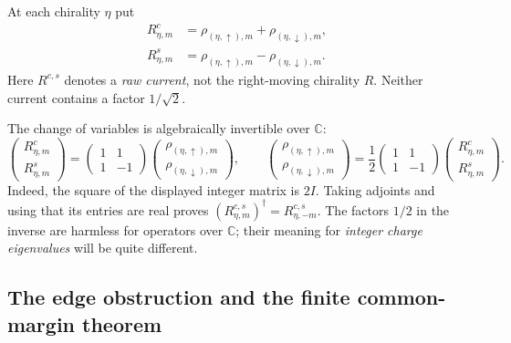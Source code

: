 \begin{definition}
\label{def:ch21-raw-currents}
At each chirality $\eta$ put
\begin{align}
 R^c_{\eta,m}&=\rho_{(\eta,\uparrow),m}
                 +\rho_{(\eta,\downarrow),m},
     \label{eq:ch21-raw-charge}\\
 R^s_{\eta,m}&=\rho_{(\eta,\uparrow),m}
                 -\rho_{(\eta,\downarrow),m}.
     \label{eq:ch21-raw-spin}
\end{align}
Here $R^{c,s}$ denotes a \emph{raw current}, not the right-moving
chirality $R$.  Neither current contains a factor $1/\sqrt2$.
\end{definition}

The change of variables is algebraically invertible over $\mathbb C$:
\begin{equation}
 \begin{pmatrix}R^c_{\eta,m}\\R^s_{\eta,m}\end{pmatrix}
 =\begin{pmatrix}1&1\\1&-1\end{pmatrix}
   \begin{pmatrix}\rho_{(\eta,\uparrow),m}\\
                   \rho_{(\eta,\downarrow),m}\end{pmatrix},
 \qquad
 \begin{pmatrix}\rho_{(\eta,\uparrow),m}\\
                   \rho_{(\eta,\downarrow),m}\end{pmatrix}
 =\frac12\begin{pmatrix}1&1\\1&-1\end{pmatrix}
   \begin{pmatrix}R^c_{\eta,m}\\R^s_{\eta,m}\end{pmatrix}.
 \label{eq:ch21-raw-inverse}
\end{equation}
Indeed, the square of the displayed integer matrix is $2I$.
Taking adjoints and using that its entries are real proves
$(R^{c,s}_{\eta,m})^\dagger=R^{c,s}_{\eta,-m}$.  The factors
$1/2$ in the inverse are harmless for operators over $\mathbb C$;
their meaning for \emph{integer charge eigenvalues} will be quite
different.

\subsection*{The edge obstruction and the finite common-margin theorem}

